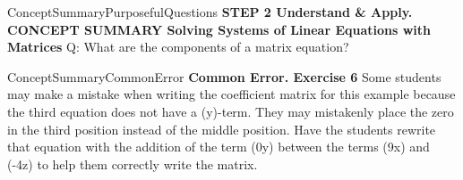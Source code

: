 \documentclass{article}
\newenvironment{te-addendum}[2]{}{}     %
\newcommand{\answer}[1]{}               %
\begin{document}
\begin{te-addendum}{ConceptSummary}{PurposefulQuestions}
\textbf{STEP 2 Understand \& Apply. CONCEPT SUMMARY Solving Systems of Linear Equations with Matrices}
Q: What are the components of a matrix equation?
\answer{the coefficient matrix, the variable matrix, and the constant matrix}
\end{te-addendum}
\begin{te-addendum}{ConceptSummary}{CommonError}
\textbf{Common Error. Exercise 6}
Some students may make a mistake when writing the coefficient matrix for this example because the third equation does not have a (y)-term. They may mistakenly place the zero in the third position instead of the middle position. Have the students rewrite that equation with the addition of the term (0y) between the terms (9x) and (-4z) to help them correctly write the matrix.
\end{te-addendum}
\end{document}
